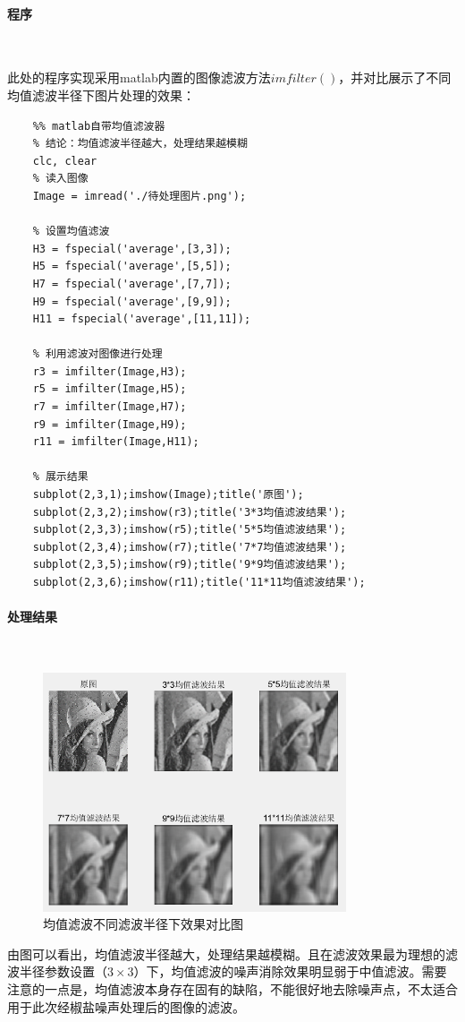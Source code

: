 \documentclass[UTF8]{article}
\begin{document}
\paragraph{程序}~{}

此处的程序实现采用matlab内置的图像滤波方法$imfilter()$，并对比展示了不同均值滤波半径下图片处理的效果：
\begin{lstlisting}
    %% matlab自带均值滤波器
    % 结论：均值滤波半径越大，处理结果越模糊
    clc, clear
    % 读入图像
    Image = imread('./待处理图片.png');
     
    % 设置均值滤波
    H3 = fspecial('average',[3,3]);
    H5 = fspecial('average',[5,5]);
    H7 = fspecial('average',[7,7]);
    H9 = fspecial('average',[9,9]);
    H11 = fspecial('average',[11,11]);
     
    % 利用滤波对图像进行处理
    r3 = imfilter(Image,H3);
    r5 = imfilter(Image,H5);
    r7 = imfilter(Image,H7);
    r9 = imfilter(Image,H9);
    r11 = imfilter(Image,H11);
    
    % 展示结果
    subplot(2,3,1);imshow(Image);title('原图');
    subplot(2,3,2);imshow(r3);title('3*3均值滤波结果');
    subplot(2,3,3);imshow(r5);title('5*5均值滤波结果');
    subplot(2,3,4);imshow(r7);title('7*7均值滤波结果');
    subplot(2,3,5);imshow(r9);title('9*9均值滤波结果');
    subplot(2,3,6);imshow(r11);title('11*11均值滤波结果');
\end{lstlisting}

\paragraph{处理结果}~{}
\begin{figure}[H]
    \centering %
    \includegraphics[width=0.8\textwidth]{figure/均值滤波结果.png} 
    \caption{均值滤波不同滤波半径下效果对比图} %
\end{figure}
由图可以看出，均值滤波半径越大，处理结果越模糊。且在滤波效果最为理想的滤波半径参数设置（$3 \times 3$）下，均值滤波的噪声消除效果明显弱于中值滤波。需要注意的一点是，均值滤波本身存在固有的缺陷，不能很好地去除噪声点，不太适合用于此次经椒盐噪声处理后的图像的滤波。
\end{document}
